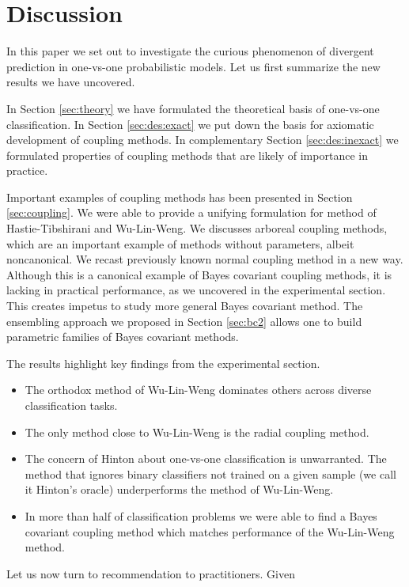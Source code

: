 \section{Discussion}

In this paper we set out to investigate the curious phenomenon of divergent prediction in one-vs-one probabilistic models. Let us first summarize the new results we have uncovered.

In Section \ref{sec:theory} we have formulated the theoretical basis of one-vs-one classification. In Section \ref{sec:des:exact} we put down the basis for axiomatic development of coupling methods. In complementary Section \ref{sec:des:inexact} we formulated properties of coupling methods that are likely of importance in practice.

Important examples of coupling methods has been presented in Section \ref{sec:coupling}. We were able to provide a unifying formulation for method of Hastie-Tibshirani and Wu-Lin-Weng. We discusses arboreal coupling methods, which are an important example of methods without parameters, albeit noncanonical. We recast previously known normal coupling method in a new way. Although this is a canonical example of Bayes covariant coupling methods,  it is lacking in practical performance, as  we uncovered in the experimental section. This creates impetus to study more general Bayes covariant method. The  ensembling approach we proposed in Section \ref{sec:bc2} allows one to build parametric families of Bayes covariant methods. 

The results highlight key findings from the experimental section.

\begin{itemize}
	\item The orthodox method of Wu-Lin-Weng dominates others across diverse classification tasks.
	\item The only method close to Wu-Lin-Weng is the radial coupling method.
	\item The concern of Hinton about one-vs-one classification is unwarranted. The method that ignores binary classifiers not trained on a given sample (we call it Hinton's oracle) underperforms the method of Wu-Lin-Weng.
	\item In more than half of classification problems we were able to find a Bayes covariant coupling method which matches performance of the Wu-Lin-Weng method. 
\end{itemize}


Let us now turn to recommendation to practitioners. Given 


